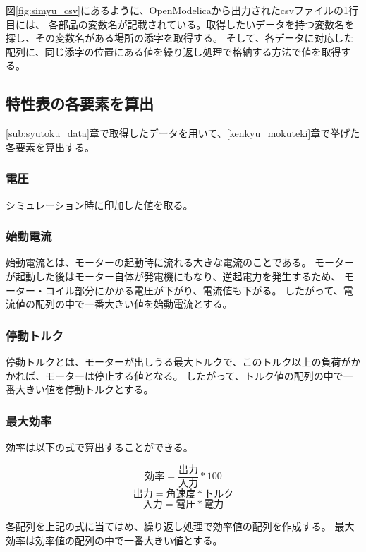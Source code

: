 図\ref{fig:simyu_csv}にあるように、OpenModelicaから出力されたcsvファイルの1行目には、
各部品の変数名が記載されている。取得したいデータを持つ変数名を探し、その変数名がある場所の添字を取得する。
そして、各データに対応した配列に、同じ添字の位置にある値を繰り返し処理で格納する方法で値を取得する。

\subsection{特性表の各要素を算出}\label{sub:keisan}
\ref{sub:syutoku_data}章で取得したデータを用いて、\ref{kenkyu_mokuteki}章で挙げた各要素を算出する。

\subsubsection{電圧}\label{sub:sub:dennatu}
シミュレーション時に印加した値を取る。

\subsubsection{始動電流}\label{sub:sub:sidouden}
始動電流とは、モーターの起動時に流れる大きな電流のことである。
モーターが起動した後はモーター自体が発電機にもなり、逆起電力を発生するため、
モーター・コイル部分にかかる電圧が下がり、電流値も下がる。
したがって、電流値の配列の中で一番大きい値を始動電流とする。

\subsubsection{停動トルク}\label{sub:sub:teidoutoruku}
停動トルクとは、モーターが出しうる最大トルクで、このトルク以上の負荷がかかれば、モーターは停止する値となる。
したがって、トルク値の配列の中で一番大きい値を停動トルクとする。

\subsubsection{最大効率}\label{sub:sub:saidaikouritu}
効率は以下の式で算出することができる。

\[
    \mbox{効率} = \frac{\mbox{出力}}{\mbox{入力}}  * 100 
\]
\[
    \mbox{出力} = \mbox{角速度} * \mbox{トルク} 
\]
\[  
    \mbox{入力} = \mbox{電圧} * \mbox{電力} 
\]

各配列を上記の式に当てはめ、繰り返し処理で効率値の配列を作成する。
最大効率は効率値の配列の中で一番大きい値とする。


